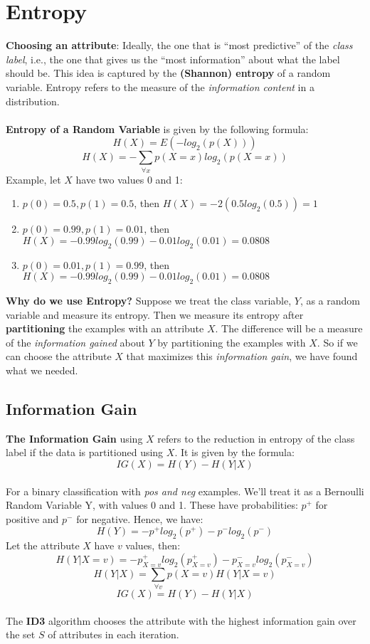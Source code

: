 \documentclass[12pt, a4paper]{book}
\begin{document}
\section{Entropy}
\textbf{Choosing an attribute}: Ideally, the one that is “most predictive” of the \textit{class label}, i.e., the one that gives us the “most information” about what the label should be. This idea is captured by the \textbf{(Shannon) entropy} of a random variable. Entropy refers to the measure of the \textit{information content} in a distribution.\\\\
\textbf{Entropy of a Random Variable} is given by the following formula:
$$H(X) = E(-log_2(p(X)))$$
$$H(X) = -\sum_{\forall x}p(X=x)log_2(p(X=x))$$
Example, let $X$ have two values 0 and 1:
\begin{enumerate}
    \item $p(0) = 0.5, p(1) = 0.5$, then $H(X) = -2(0.5log_2(0.5)) = 1$
    \item $p(0) = 0.99, p(1) = 0.01$, then $H(X) = -0.99log_2(0.99) - 0.01log_2(0.01) = 0.0808$
    \item $p(0) = 0.01, p(1) = 0.99$, then $H(X) = -0.99log_2(0.99) - 0.01log_2(0.01) = 0.0808$\\
\end{enumerate}
\textbf{Why do we use Entropy?} Suppose we treat the class variable, $Y$, as a random variable and measure its entropy. Then we measure its entropy after \textbf{partitioning} the examples with an attribute $X$. The difference will be a measure of the \textit{information gained} about $Y$ by partitioning the examples with $X$. So if we can choose the attribute $X$ that maximizes this \textit{information gain}, we have found what we needed.

\subsection{Information Gain}
\textbf{The Information Gain} using $X$ refers to the reduction in entropy of the class label if the data is partitioned using $X$. It is given by the formula:
$$IG(X) = H(Y) - H(Y|X)$$\\
For a binary classification with \textit{pos and neg} examples. We'll treat it as a Bernoulli Random Variable Y, with values 0 and 1. These have probabilities: $p^+$ for positive and $p^-$ for negative. Hence, we have:
$$H(Y) = -p^+log_2(p^+) -p^-log_2(p^-)$$
Let the attribute $X$ have $v$ values, then:
$$H(Y|X=v) = -p^+_{X=v}log_2(p^+_{X=v}) - p^-_{X=v}log_2(p^-_{X=v})$$
$$H(Y|X) = \sum_{\forall v}p(X = v)H(Y|X=v)$$
$$IG(X) = H(Y) - H(Y|X)$$\\
The \textbf{ID3} algorithm chooses the attribute with the highest information gain over the set $S$ of attributes in each iteration.
\end{document}
